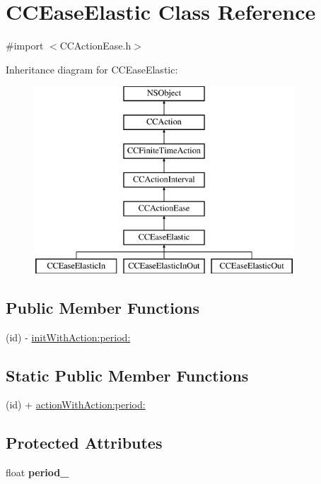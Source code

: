 \hypertarget{interface_c_c_ease_elastic}{\section{C\-C\-Ease\-Elastic Class Reference}
\label{interface_c_c_ease_elastic}
}


{\ttfamily \#import $<$C\-C\-Action\-Ease.\-h$>$}

Inheritance diagram for C\-C\-Ease\-Elastic\-:\begin{figure}[H]
\begin{center}
\leavevmode
\includegraphics[height=7.000000cm]{interface_c_c_ease_elastic}
\end{center}
\end{figure}
\subsection*{Public Member Functions}
\begin{DoxyCompactItemize}
\item 
(id) -\/ \hyperlink{interface_c_c_ease_elastic_a37b84329236ee9a3d3f74b0eaf528ab8}{init\-With\-Action\-:period\-:}
\end{DoxyCompactItemize}
\subsection*{Static Public Member Functions}
\begin{DoxyCompactItemize}
\item 
(id) + \hyperlink{interface_c_c_ease_elastic_acf1e145fd87d7bb5bf77440be72f09d5}{action\-With\-Action\-:period\-:}
\end{DoxyCompactItemize}
\subsection*{Protected Attributes}
\begin{DoxyCompactItemize}
\item 
\hypertarget{interface_c_c_ease_elastic_aa7359be6be34aca082b75f31c90644b6}{float {\bfseries period\-\_\-}}\label{interface_c_c_ease_elastic_aa7359be6be34aca082b75f31c90644b6}

\end{DoxyCompactItemize}
